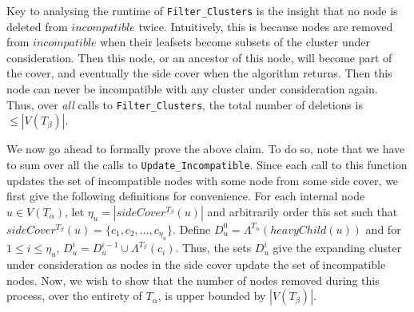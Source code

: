 \documentclass{article}
\newcommand{\leafset}{\Lambda}
\newcommand{\TA}{T_\alpha}
\newcommand{\TB}{T_\beta}
\begin{document}
    Key to analysing the runtime of \texttt{Filter\_Clusters} is the insight that no node is deleted from $incompatible$ twice. Intuitively, this is because nodes are removed from $incompatible$ when their leafsets become subsets of the cluster under consideration. Then this node, or an ancestor of this node, will become part of the cover, and eventually the side cover when the algorithm returns. Then this node can never be incompatible with any cluster under consideration again. Thus, over \textit{all} calls to \texttt{Filter\_Clusters}, the total number of deletions is $\leq |V(\TB)|$.

    We now go ahead to formally prove the above claim. To do so, note that we have to sum over all the calls to \texttt{Update\_Incompatible}. Since each call to this function updates the set of incompatible nodes with some node from some side cover, we first give the following definitions for convenience. For each internal node $u \in V(\TA)$, let $\eta_u = |sideCover^{\TB}(u)|$ and arbitrarily order this set such that $sideCover^{\TB}(u) = \{c_1, c_2, \dots, c_{\eta_u}\}$. Define $D_u^0 = \leafset^{\TA}(heavyChild(u))$ and for $1 \leq i \leq \eta_u$, $D_u^i = D_u^{i-1} \cup \leafset^{\TB}(c_i)$. Thus, the sets $D_u^i$ give the expanding cluster under consideration as nodes in the side cover update the set of incompatible nodes. Now, we wish to show that the number of nodes removed during this process, over the entirety of $\TA$, is upper bounded by $|V(\TB)|$.
    \newline
\end{document}
